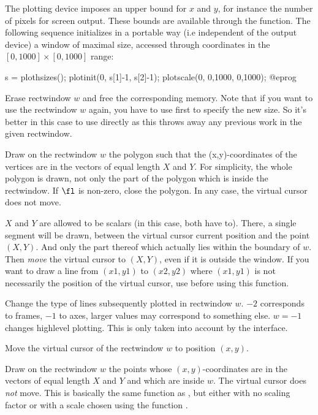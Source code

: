 The plotting device imposes an upper bound for $x$ and $y$, for instance the
number of pixels for screen output. These bounds are available through the
 function. The following sequence initializes in a portable
way (i.e independent of the output device) a window of maximal size, accessed
through coordinates in the $[0,1000] \times [0,1000]$ range:

\bprog
s = plothsizes();
plotinit(0, s[1]-1, s[2]-1);
plotscale(0, 0,1000, 0,1000);
@eprog

\label{se:plotkill}
Erase rectwindow $w$ and free the corresponding memory. Note that if you
want to use the rectwindow $w$ again, you have to use  first
to specify the new size. So it's better in this case to use 
directly as this throws away any previous work in the given rectwindow.

\label{se:plotlines}
Draw on the rectwindow $w$
the polygon such that the (x,y)-coordinates of the vertices are in the
vectors of equal length $X$ and $Y$. For simplicity, the whole
polygon is drawn, not only the part of the polygon which is inside the
rectwindow. If $\fl$ is non-zero, close the polygon. In any case, the
virtual cursor does not move.

$X$ and $Y$ are allowed to be scalars (in this case, both have to).
There, a single segment will be drawn, between the virtual cursor current
position and the point $(X,Y)$. And only the part thereof which
actually lies within the boundary of $w$. Then \emph{move} the virtual cursor
to $(X,Y)$, even if it is outside the window. If you want to draw a
line from $(x1,y1)$ to $(x2,y2)$ where $(x1,y1)$ is not necessarily the
position of the virtual cursor, use  before using this
function.

\label{se:plotlinetype}
Change the type of lines subsequently plotted in rectwindow $w$.
 $-2$ corresponds to frames, $-1$ to axes, larger values may
correspond to something else. $w = -1$ changes highlevel plotting. This is
only taken into account by the  interface.

\label{se:plotmove}
Move the virtual cursor of the rectwindow $w$ to position $(x,y)$.

\label{se:plotpoints}
Draw on the rectwindow $w$ the
points whose $(x,y)$-coordinates are in the vectors of equal length $X$ and
$Y$ and which are inside $w$. The virtual cursor does \emph{not} move. This
is basically the same function as , but either with no scaling
factor or with a scale chosen using the function .

